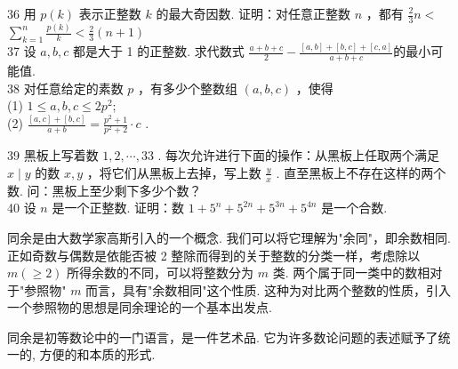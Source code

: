 36 用 $p(k)$ 表示正整数 $k$ 的最大奇因数. 证明：对任意正整数 $n$ ，都有 $\frac{2}{3} n<$ $\sum_{k=1}^{n} \frac{p(k)}{k}<\frac{2}{3}(n+1)$\\
37 设 $a ,  b ,  c$ 都是大于 1 的正整数. 求代数式 $\frac{a+b+c}{2}-\frac{[a, b]+[b, c]+[c, a]}{a+b+c}$的最小可能值. \\
38 对任意给定的素数 $p$ ，有多少个整数组 $(a, b, c)$ ，使得\\
(1) $1 \leqslant a, b, c \leqslant 2 p^{2}$;\\
(2) $\frac{[a, c]+[b, c]}{a+b}=\frac{p^{2}+1}{p^{2}+2} \cdot c$ . 

39 黑板上写着数 $1,2, \cdots, 33$ . 每次允许进行下面的操作：从黑板上任取两个满足 $x \mid y$ 的数 $x ,  y$ ，将它们从黑板上去掉，写上数 $\frac{y}{x}$ . 直至黑板上不存在这样的两个数. 问：黑板上至少剩下多少个数？\\
40 设 $n$ 是一个正整数. 证明：数 $1+5^{n}+5^{2 n}+5^{3 n}+5^{4 n}$ 是一个合数. 

同余是由大数学家高斯引入的一个概念. 我们可以将它理解为"余同"，即余数相同. 正如奇数与偶数是依能否被 2 整除而得到的关于整数的分类一样，考虑除以 $m(\geqslant 2)$ 所得余数的不同，可以将整数分为 $m$ 类. 两个属于同一类中的数相对于"参照物" $m$ 而言，具有"余数相同"这个性质. 这种为对比两个整数的性质，引入一个参照物的思想是同余理论的一个基本出发点. 

同余是初等数论中的一门语言，是一件艺术品. 它为许多数论问题的表述赋予了统一的, 方便的和本质的形式. 


